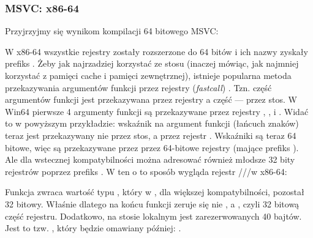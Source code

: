 \subsubsection{MSVC: x86-64}

Przyjrzyjmy się wynikom kompilacji 64 bitowego MSVC:




W x86-64 wszystkie rejestry zostały rozszerzone do 64 bitów i ich nazwy zyskały prefiks .
Żeby jak najrzadziej korzystać ze stosu (inaczej mówiąc, jak najmniej korzystać z pamięci cache i pamięci zewnętrznej), istnieje popularna metoda przekazywania argumentów funkcji przez rejestry (\emph{fastcall}) .
Tzn. część argumentów funkcji jest przekazywana przez rejestry a część --- przez stos.
W Win64 pierwsze 4 argumenty funkcji są przekazywane przez rejestry \RCX, \RDX,  i .
Widać to w powyższym przykładzie: wskaźnik na argument funkcji \printf (łańcuch znaków) teraz jest przekazywany nie przez stos, a przez rejestr \RCX.
Wskaźniki są teraz 64 bitowe, więc są przekazywane przez przez 64-bitowe rejestry (mające prefiks ).
Ale dla wstecznej kompatybilności można adresować również młodsze 32 bity rejestrów poprzez prefiks .
W ten o to sposób wygląda rejestr \RAX/\EAX/\AX/\AL w x86-64:


Funkcja \main zwraca wartość typu \Tint, który w \CCpp, dla większej kompatybilności,
pozostał 32 bitowy. Właśnie dlatego na końcu funkcji \main zeruje się nie \RAX, a \EAX, czyli 32 bitową część rejestru.
Dodatkowo, na stosie lokalnym jest zarezerwowanych 40 bajtów.
Jest to tzw. , który będzie omawiany później: .

